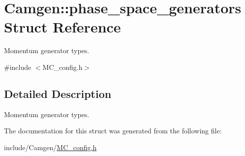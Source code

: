 \hypertarget{a00423}{}\section{Camgen\+:\+:phase\+\_\+space\+\_\+generators Struct Reference}
\label{a00423}


Momentum generator types.  




{\ttfamily \#include $<$M\+C\+\_\+config.\+h$>$}



\subsection{Detailed Description}
Momentum generator types. 

The documentation for this struct was generated from the following file\+:\begin{DoxyCompactItemize}
\item 
include/\+Camgen/\hyperlink{a00690}{M\+C\+\_\+config.\+h}\end{DoxyCompactItemize}

